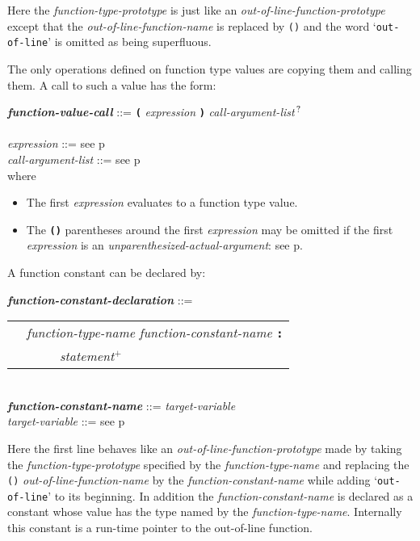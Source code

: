 \documentclass[12pt]{article}
\newcommand{\TT}[1]{{\tt \bfseries #1}}
\newcommand{\PLUS}[1][]{{$^{+#1}$}}
\newcommand{\QMARK}{{$^{\,\mbox{\footnotesize ?}}$}}
\newcommand{\emkey}[1]{{\em \bfseries #1}}
\newcommand{\pagref}[1]{p\pageref{#1}}
\newenvironment{indpar}[1][0.3in]%
	{\begin{list}{}%
		     {\setlength{\itemsep}{0in}%
		      \setlength{\topsep}{0in}%
		      \setlength{\parsep}{1ex}%
		      \setlength{\labelwidth}{#1}%
		      \setlength{\leftmargin}{#1}%
		      \addtolength{\leftmargin}{\labelsep}}%
	 \item}%
	{\end{list}}
\begin{document}
Here the {\em function-type-prototype} is just like an
{\em out-of-line-function-prototype} except that the
{\em out-of-line-function-name} is replaced by {\tt ()} and
the word `{\tt out-of-line}' is omitted as being superfluous.

The only operations defined on function type values are copying them and
calling them.  A call to such a value has the form:
\begin{indpar}
\emkey{function-value-call}\label{FUNCTION-VALUE-CALL} ::=
	\TT{(} {\em expression} \TT{)}
	     {\em call-argument-list}\QMARK{} \\
\\[0.5ex]
{\em expression} ::= see \pagref{EXPRESSION}
\\[0.5ex]
{\em call-argument-list} ::= see \pagref{CALL-ARGUMENT-LIST}
\\[1ex]
where
\begin{itemize}
\item The first {\em expression} evaluates to a function type value.
\item The \TT{()} parentheses around the first {\em expression} may be
omitted if the first {\em expression} is an
{\em unparenthesized-actual-argument}:
see \pagref{UNPARENTHESIZED-ACTUAL-ARGUMENT}.
\end{itemize}
\end{indpar}

A function constant can be declared by:
\begin{indpar}
\emkey{function-constant-declaration}%
    \label{FUNCTION-CONSTANT-DECLARATION} ::= \\
\hspace*{0.5in}
    \begin{tabular}[t]{rl}
        &  {\em function-type-name} {\em function-constant-name} \TT{:} \\
	& \TT{~~~~~}{\em statement}\PLUS{} \\
    \end{tabular}
\\[0.5ex]
\emkey{function-constant-name} ::= {\em target-variable}
\\[0.5ex]
{\em target-variable} ::= see \pagref{TARGET-VARIABLE}
\end{indpar}

Here the first line behaves like an {\em out-of-line-function-prototype}
made by taking the {\em function-type-prototype} specified by the
{\em function-type-name} and replacing the {\tt ()}
{\em out-of-line-function-name} by the {\em function-constant-name}
while adding `{\tt out-of-line}' to its beginning.  In addition
the {\em function-constant-name} is declared as a constant whose
value has the type named by the {\em function-type-name}.
Internally this constant is a run-time pointer to the out-of-line function.
\end{document}
